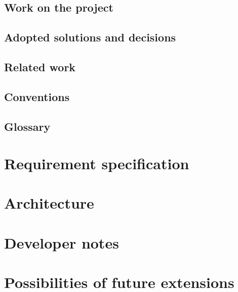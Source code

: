 \documentclass[12pt,a4paper]{report}
\begin{document}
\section{Work on the project}
\section{Adopted solutions and decisions}
\section{Related work}

\section{Conventions}
\section{Glossary}

\chapter{Requirement specification}

\chapter{Architecture}

\chapter{Developer notes}

\chapter{Possibilities of future extensions}
\end{document}
